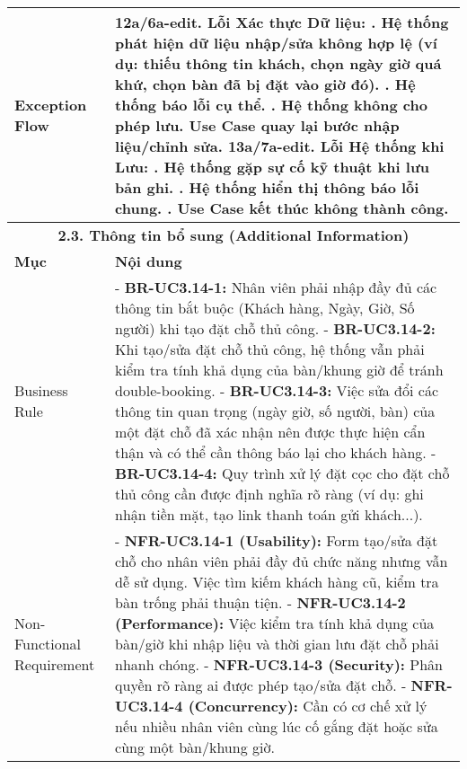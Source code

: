 \begin{longtable}{|m{4cm}|p{11cm}|}
\hline
Exception Flow & \textbf{12a/6a-edit. Lỗi Xác thực Dữ liệu:} \newline    1. Hệ thống phát hiện dữ liệu nhập/sửa không hợp lệ (ví dụ: thiếu thông tin khách, chọn ngày giờ quá khứ, chọn bàn đã bị đặt vào giờ đó). \newline    2. Hệ thống báo lỗi cụ thể. \newline    3. Hệ thống không cho phép lưu. Use Case quay lại bước nhập liệu/chỉnh sửa. \newline \textbf{13a/7a-edit. Lỗi Hệ thống khi Lưu:} \newline    1. Hệ thống gặp sự cố kỹ thuật khi lưu bản ghi. \newline    2. Hệ thống hiển thị thông báo lỗi chung. \newline    3. Use Case kết thúc không thành công. \\
\hline
\multicolumn{2}{|c|}{\textbf{2.3. Thông tin bổ sung (Additional Information)}} \\
\hline
\textbf{Mục} & \textbf{Nội dung} \\
\hline
Business Rule & - \textbf{BR-UC3.14-1:} Nhân viên phải nhập đầy đủ các thông tin bắt buộc (Khách hàng, Ngày, Giờ, Số người) khi tạo đặt chỗ thủ công. \newline - \textbf{BR-UC3.14-2:} Khi tạo/sửa đặt chỗ thủ công, hệ thống vẫn phải kiểm tra tính khả dụng của bàn/khung giờ để tránh double-booking. \newline - \textbf{BR-UC3.14-3:} Việc sửa đổi các thông tin quan trọng (ngày giờ, số người, bàn) của một đặt chỗ đã xác nhận nên được thực hiện cẩn thận và có thể cần thông báo lại cho khách hàng. \newline - \textbf{BR-UC3.14-4:} Quy trình xử lý đặt cọc cho đặt chỗ thủ công cần được định nghĩa rõ ràng (ví dụ: ghi nhận tiền mặt, tạo link thanh toán gửi khách...). \\
\hline
Non-Functional Requirement & - \textbf{NFR-UC3.14-1 (Usability):} Form tạo/sửa đặt chỗ cho nhân viên phải đầy đủ chức năng nhưng vẫn dễ sử dụng. Việc tìm kiếm khách hàng cũ, kiểm tra bàn trống phải thuận tiện. \newline - \textbf{NFR-UC3.14-2 (Performance):} Việc kiểm tra tính khả dụng của bàn/giờ khi nhập liệu và thời gian lưu đặt chỗ phải nhanh chóng. \newline - \textbf{NFR-UC3.14-3 (Security):} Phân quyền rõ ràng ai được phép tạo/sửa đặt chỗ. \newline - \textbf{NFR-UC3.14-4 (Concurrency):} Cần có cơ chế xử lý nếu nhiều nhân viên cùng lúc cố gắng đặt hoặc sửa cùng một bàn/khung giờ. \\
\hline
\end{longtable}

